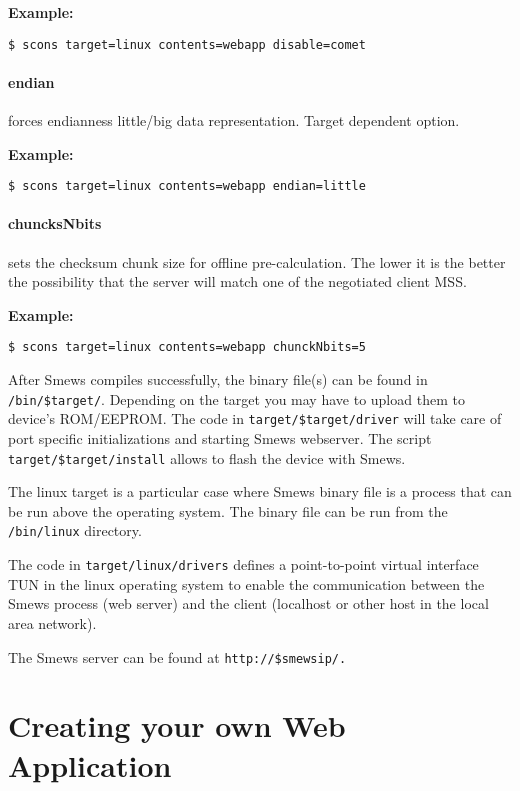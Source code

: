 \documentclass{report}
\begin{document}
\textbf{Example:} 
\begin{verbatim}
$ scons target=linux contents=webapp disable=comet
\end{verbatim}

\paragraph{endian} forces endianness little/big data representation. Target dependent option.

\textbf{Example:} 
\begin{verbatim}
$ scons target=linux contents=webapp endian=little
\end{verbatim}

\paragraph{chuncksNbits} sets the checksum chunk size for offline pre-calculation. The lower it is the better the possibility that the server will match one of the negotiated client MSS.

\textbf{Example:} 
\begin{verbatim}
$ scons target=linux contents=webapp chunckNbits=5
\end{verbatim}

After Smews compiles successfully, the binary file(s) can be found in \texttt{/bin/\$target/}. Depending on the target you may 
have to upload them to device's ROM/EEPROM. The code in \texttt{target/\$target/driver} will take care of port specific initializations and starting Smews webserver. The script \texttt{target/\$target/install} allows to flash the device with Smews.

The linux target is a particular case where Smews binary file is a process that can be run above the operating system. The binary file can be run from the \texttt{/bin/linux} directory.

The code in \texttt{target/linux/drivers} defines a point-to-point virtual interface TUN in the linux operating system to enable the communication between the Smews process (web server) and the client (localhost or other host in the local area network).

The Smews server can be found at \texttt{http://\$smewsip/.}

\section{Creating your own Web Application}
\end{document}
